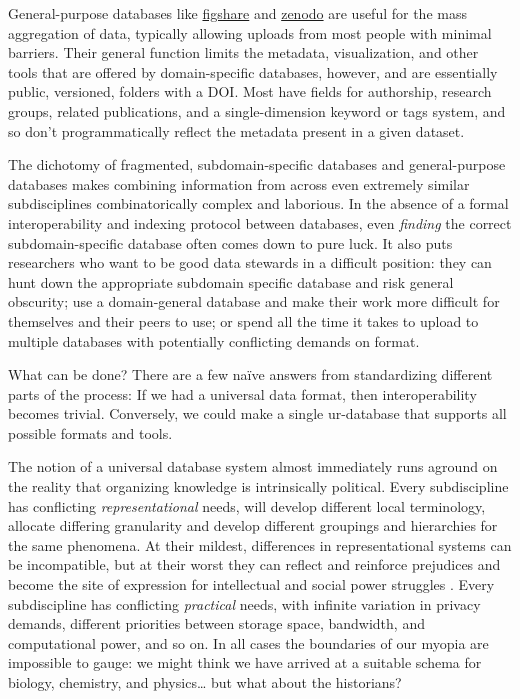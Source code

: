 General-purpose databases like \href{https://figshare.com/}{figshare}
and \href{https://zenodo.org/}{zenodo} are useful for the mass aggregation
of data, typically allowing uploads from most people with minimal
barriers. Their general function limits the metadata, visualization, and
other tools that are offered by domain-specific databases, however, and
are essentially public, versioned, folders with a DOI. Most have fields
for authorship, research groups, related publications, and a
single-dimension keyword or tags system, and so don't programmatically
reflect the metadata present in a given dataset.

The dichotomy of fragmented, subdomain-specific databases and
general-purpose databases makes combining information from across even
extremely similar subdisciplines combinatorically complex and laborious.
In the absence of a formal interoperability and indexing protocol
between databases, even \emph{finding} the correct subdomain-specific
database often comes down to pure luck. It also puts researchers who
want to be good data stewards in a difficult position: they can hunt
down the appropriate subdomain specific database and risk general
obscurity; use a domain-general database and make their work more
difficult for themselves and their peers to use; or spend all the time
it takes to upload to multiple databases with potentially conflicting
demands on format.

What can be done? There are a few naïve answers from standardizing
different parts of the process: If we had a universal data format, then
interoperability becomes trivial. Conversely, we could make a single
ur-database that supports all possible formats and tools.

The notion of a universal database system almost immediately runs
aground on the reality that organizing knowledge is intrinsically
political. Every subdiscipline has conflicting \emph{representational}
needs, will develop different local terminology, allocate differing
granularity and develop different groupings and hierarchies for the same
phenomena. At their mildest, differences in representational systems can
be incompatible, but at their worst they can reflect and reinforce
prejudices and become the site of expression for intellectual and social
power struggles \citep{joLessonsArchivesStrategies2020, selbstFairnessAbstractionSociotechnical2019, gebruDatasheetsDatasets2021, bowkerSortingThingsOut1999} . Every subdiscipline has conflicting
\emph{practical} needs, with infinite variation in privacy demands,
different priorities between storage space, bandwidth, and computational
power, and so on. In all cases the boundaries of our myopia are
impossible to gauge: we might think we have arrived at a suitable schema
for biology, chemistry, and physics\ldots{} but what about the
historians?

